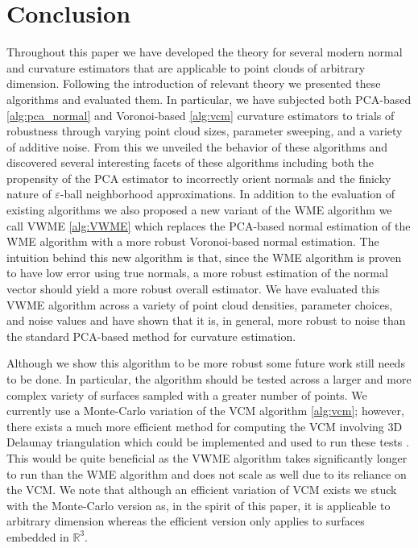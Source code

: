 \documentclass{article}
\begin{document}
\section{Conclusion}

Throughout this paper we have developed the theory for several modern normal and curvature estimators that are applicable to point clouds of arbitrary dimension. Following the introduction of relevant theory we presented these algorithms and evaluated them. In particular, we have subjected both PCA-based \eqref{alg:pca_normal} and Voronoi-based \eqref{alg:vcm} curvature estimators to trials of robustness through varying point cloud sizes, parameter sweeping, and a variety of additive noise.  From this we unveiled the behavior of these algorithms and discovered several interesting facets of these algorithms including both the propensity of the PCA estimator to incorrectly orient normals and the finicky nature of $\varepsilon$-ball neighborhood approximations. 
In addition to the evaluation of existing algorithms we also proposed a new variant of the WME algorithm we call VWME \eqref{alg:VWME} which replaces the PCA-based normal estimation of the WME algorithm with a more robust Voronoi-based normal estimation. The intuition behind this new algorithm is that, since the WME algorithm is proven to have low error using true normals, a more robust estimation of the normal vector should yield a more robust overall estimator. We have evaluated this VWME algorithm across a variety of point cloud densities, parameter choices, and noise values and have shown that it is, in general, more robust to noise than the standard PCA-based method for curvature estimation. 

Although we show this algorithm to be more robust some future work still needs to be done. In particular, the algorithm should be tested across a larger and more complex variety of surfaces sampled with a greater number of points. We currently use a Monte-Carlo variation of the VCM algorithm \eqref{alg:vcm}; however, there exists a much more efficient method for computing the VCM involving 3D Delaunay triangulation which could be implemented and used to run these tests \cite{merigotVORONOI2011}. This would be quite beneficial as the VWME algorithm takes significantly longer to run than the WME algorithm and does not scale as well due to its reliance on the VCM. We note that although an efficient variation of VCM exists we stuck with the Monte-Carlo version as, in the spirit of this paper, it is applicable to arbitrary dimension whereas the efficient version only applies to surfaces embedded in $\mathbb{R}^3$.





\end{document}
